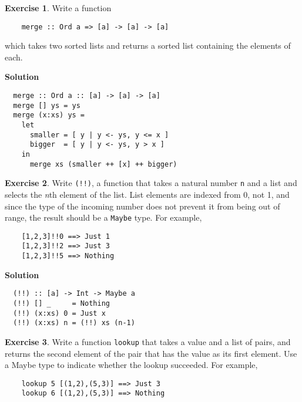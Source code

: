 \documentclass[11pt,a4paper]{article}
\theoremstyle{definition}
\newtheorem{exr}{Exercise}
\begin{document}
\vspace{5mm}

\begin{exr}
  Write a function

  \begin{lstlisting}
    merge :: Ord a => [a] -> [a] -> [a]
  \end{lstlisting}

  which takes two sorted lists and returns a sorted list containing the 
  elements of each.
\end{exr}

\textbf{Solution}
\begin{lstlisting}
  merge :: Ord a :: [a] -> [a] -> [a]
  merge [] ys = ys
  merge (x:xs) ys = 
    let 
      smaller = [ y | y <- ys, y <= x ]
      bigger  = [ y | y <- ys, y > x ]
    in
      merge xs (smaller ++ [x] ++ bigger)
\end{lstlisting}


\vspace{5mm}

\begin{exr}
  Write \texttt{(!!)}, a function that takes a natural number \texttt{n} 
  and a list and selects the \emph{n}th element of the list. List elements
  are indexed from 0, not 1, and since the type of the incoming number 
  does not prevent it from being out of range, the result should be 
  a \texttt{Maybe} type. For example,

  \begin{lstlisting}
    [1,2,3]!!0 ==> Just 1
    [1,2,3]!!2 ==> Just 3
    [1,2,3]!!5 ==> Nothing
  \end{lstlisting}
\end{exr}

\textbf{Solution}
\begin{lstlisting}
  (!!) :: [a] -> Int -> Maybe a
  (!!) [] _     = Nothing
  (!!) (x:xs) 0 = Just x
  (!!) (x:xs) n = (!!) xs (n-1)
\end{lstlisting}


\vspace{5mm}

\begin{exr}
  Write a function \texttt{lookup} that takes a value and a list of pairs, 
  and returns the second element of the pair that has the value as its 
  first element. Use a Maybe type to indicate whether the lookup succeeded. 
  For example,

  \begin{lstlisting}
    lookup 5 [(1,2),(5,3)] ==> Just 3
    lookup 6 [(1,2),(5,3)] ==> Nothing
  \end{lstlisting}
\end{exr}
\end{document}
